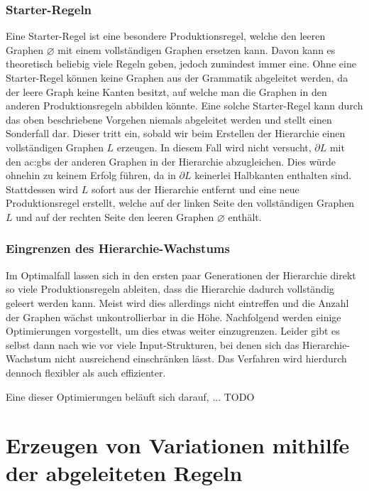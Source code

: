 \subsubsection{Starter-Regeln}
Eine Starter-Regel ist eine besondere Produktionsregel, welche den leeren Graphen \(\varnothing\) mit einem vollständigen Graphen ersetzen kann. Davon
kann es theoretisch beliebig viele Regeln geben, jedoch zumindest immer eine. Ohne eine Starter-Regel können keine Graphen aus der Grammatik abgeleitet werden,
da der leere Graph keine Kanten besitzt, auf welche man die Graphen in den anderen Produktionsregeln abbilden könnte. Eine solche Starter-Regel kann durch
das oben beschriebene Vorgehen niemals abgeleitet werden und stellt einen Sonderfall dar. Dieser tritt ein, sobald wir beim Erstellen der Hierarchie
einen vollständigen Graphen \(L\) erzeugen. In diesem Fall wird nicht versucht, \(\partial L\) mit den \gls{ac:gbs} der anderen Graphen in der Hierarchie
abzugleichen. Dies würde ohnehin zu keinem Erfolg führen, da in \(\partial L\) keinerlei Halbkanten enthalten sind. Stattdessen wird \(L\) sofort aus der
Hierarchie entfernt und eine neue Produktionsregel erstellt, welche auf der linken Seite den vollständigen Graphen \(L\) und auf der rechten Seite den
leeren Graphen \(\varnothing\) enthält.

\subsubsection{Eingrenzen des Hierarchie-Wachstums}
Im Optimalfall lassen sich in den ersten paar Generationen der Hierarchie direkt so viele Produktionsregeln ableiten, dass die Hierarchie dadurch vollständig
geleert werden kann. Meist wird dies allerdings nicht eintreffen und die Anzahl der Graphen wächst unkontrollierbar in die Höhe. Nachfolgend werden einige
Optimierungen vorgestellt, um dies etwas weiter einzugrenzen. Leider gibt es selbst dann nach wie vor viele Input-Strukturen, bei denen sich das
Hierarchie-Wachstum nicht ausreichend einschränken lässt. Das Verfahren wird hierdurch dennoch flexibler als auch effizienter.

Eine dieser Optimierungen beläuft sich darauf, ... TODO


\section{Erzeugen von Variationen mithilfe der abgeleiteten Regeln}
